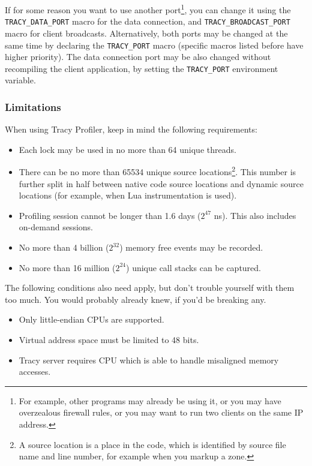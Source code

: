 \documentclass[hidelinks,titlepage,a4paper]{article}
\begin{document}
If for some reason you want to use another port\footnote{For example, other programs may already be using it, or you may have overzealous firewall rules, or you may want to run two clients on the same IP address.}, you can change it using the \texttt{TRACY\_DATA\_PORT} macro for the data connection, and \texttt{TRACY\_BROADCAST\_PORT} macro for client broadcasts. Alternatively, both ports may be changed at the same time by declaring the \texttt{TRACY\_PORT} macro (specific macros listed before have higher priority). The data connection port may be also changed without recompiling the client application, by setting the \texttt{TRACY\_PORT} environment variable.

\subsubsection{Limitations}

When using Tracy Profiler, keep in mind the following requirements:

\begin{itemize}
\item Each lock may be used in no more than 64 unique threads.
\item There can be no more than 65534 unique source locations\footnote{A source location is a place in the code, which is identified by source file name and line number, for example when you markup a zone.}. This number is further split in half between native code source locations and dynamic source locations (for example, when Lua instrumentation is used).
\item Profiling session cannot be longer than 1.6 days ($2^{47}$ \si{\nano\second}). This also includes on-demand sessions.
\item No more than 4 billion ($2^{32}$) memory free events may be recorded.
\item No more than 16 million ($2^{24}$) unique call stacks can be captured.
\end{itemize}

The following conditions also need apply, but don't trouble yourself with them too much. You would probably already knew, if you'd be breaking any.

\begin{itemize}
\item Only little-endian CPUs are supported.
\item Virtual address space must be limited to 48 bits.
\item Tracy server requires CPU which is able to handle misaligned memory accesses.
\end{itemize}
\end{document}
